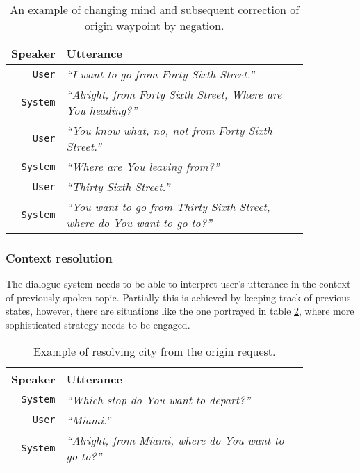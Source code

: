 \begin{table}[h]
\centering
\begin{tabular}{ | r | p{0.85\linewidth} | } \hline
	Speaker & Utterance \\ \hline
	\texttt{User} & \textit{``I want to go from Forty Sixth Street.''} \\ \hline
	\texttt{System} & \textit{``Alright, from Forty Sixth Street, Where are You heading?''} \\ \hline	
	\texttt{User} & \textit{``You know what, no, not from Forty Sixth Street.''} \\ \hline
	\texttt{System} & \textit{``Where are You leaving from?''} \\ \hline
	\texttt{User} & \textit{``Thirty Sixth Street.''} \\ \hline
	\texttt{System} & \textit{``You want to go from Thirty Sixth Street, where do You want to go to?''} \\ \hline
\end{tabular}
\caption[Changing input by negation]{An example of changing mind and subsequent correction of origin waypoint by negation.}
\label{table:negation}
\end{table}

\subsubsection{Context resolution}

The dialogue system needs to be able to interpret user's utterance in the context of previously spoken topic.
Partially this is achieved by keeping track of previous states, however, there are situations like the one portrayed in table \ref{table:cr}, where more sophisticated strategy needs to be engaged.

\begin{table}[h]
\centering
\begin{tabular}{ | r | p{0.85\linewidth} | } \hline
	Speaker & Utterance \\ \hline
	\texttt{System} & \textit{``Which stop do You want to depart?''} \\ \hline
	\texttt{User} & \textit{``Miami.}'' \\ \hline
	\texttt{System} & \textit{``Alright, from Miami, where do You want to go to?''} \\ \hline
\end{tabular}
\caption[Context resolution of origin waypoint]{Example of resolving city from the origin request.}
\label{table:cr}
\end{table}

